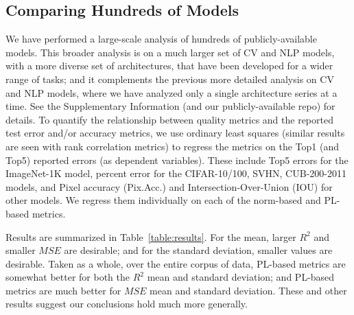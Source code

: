 \subsection{Comparing Hundreds of Models}
\label{sxn:all_cv_models}


We have performed a large-scale analysis of hundreds of publicly-available models.
This broader analysis is on a much larger set of CV and NLP models, with a more diverse set of architectures, that have been developed for a wider range of tasks; and it complements the previous more detailed analysis on CV and NLP models, where we have analyzed only a single architecture series at a time.
See the Supplementary Information
(and our publicly-available repo)
for details.
To quantify the relationship between quality metrics and the reported test error and/or accuracy metrics, we use ordinary least squares (similar results are seen with rank correlation metrics) to regress the metrics on the Top1 (and Top5) reported errors (as dependent variables).
These include Top5 errors for the ImageNet-1K model, percent error for the CIFAR-10/100, SVHN, CUB-200-2011 models, and Pixel accuracy (Pix.Acc.) and Intersection-Over-Union (IOU) for other models.
We regress them individually on each of the norm-based and PL-based metrics.




Results are summarized in Table~\ref{table:results}.
For the mean, larger $R^{2}$ and smaller $MSE$ are desirable; and for the standard deviation, smaller values are desirable.
Taken as a whole, over the entire corpus of data, PL-based metrics are somewhat better for both the $R^{2}$ mean and standard deviation;
and PL-based metrics are much better for $MSE$ mean and standard deviation.
These and other results suggest our conclusions hold much more generally.

